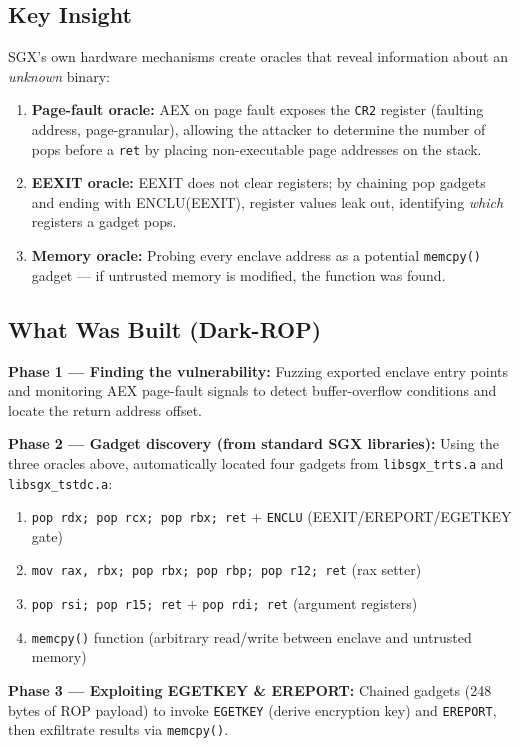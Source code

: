 \documentclass[11pt,letterpaper]{article}
\begin{document}
\subsection*{Key Insight}
SGX's own hardware mechanisms create oracles that reveal information about an \emph{unknown} binary:
\begin{enumerate}
    \item \textbf{Page-fault oracle:} AEX on page fault exposes the \texttt{CR2} register (faulting address, page-granular), allowing the attacker to determine the number of pops before a \texttt{ret} by placing non-executable page addresses on the stack.
    \item \textbf{EEXIT oracle:} EEXIT does not clear registers; by chaining pop gadgets and ending with ENCLU(EEXIT), register values leak out, identifying \emph{which} registers a gadget pops.
    \item \textbf{Memory oracle:} Probing every enclave address as a potential \texttt{memcpy()} gadget — if untrusted memory is modified, the function was found.
\end{enumerate}

\subsection*{What Was Built (Dark-ROP)}
\textbf{Phase 1 — Finding the vulnerability:}
Fuzzing exported enclave entry points and monitoring AEX page-fault signals to detect buffer-overflow conditions and locate the return address offset.

\textbf{Phase 2 — Gadget discovery (from standard SGX libraries):}
Using the three oracles above, automatically located four gadgets from \texttt{libsgx\_trts.a} and \texttt{libsgx\_tstdc.a}:
\begin{enumerate}
    \item \texttt{pop rdx; pop rcx; pop rbx; ret} + \texttt{ENCLU} (EEXIT/EREPORT/EGETKEY gate)
    \item \texttt{mov rax, rbx; pop rbx; pop rbp; pop r12; ret} (rax setter)
    \item \texttt{pop rsi; pop r15; ret} + \texttt{pop rdi; ret} (argument registers)
    \item \texttt{memcpy()} function (arbitrary read/write between enclave and untrusted memory)
\end{enumerate}

\textbf{Phase 3 — Exploiting EGETKEY \& EREPORT:}
Chained gadgets (248 bytes of ROP payload) to invoke \texttt{EGETKEY} (derive encryption key) and \texttt{EREPORT}, then exfiltrate results via \texttt{memcpy()}.
\end{document}
